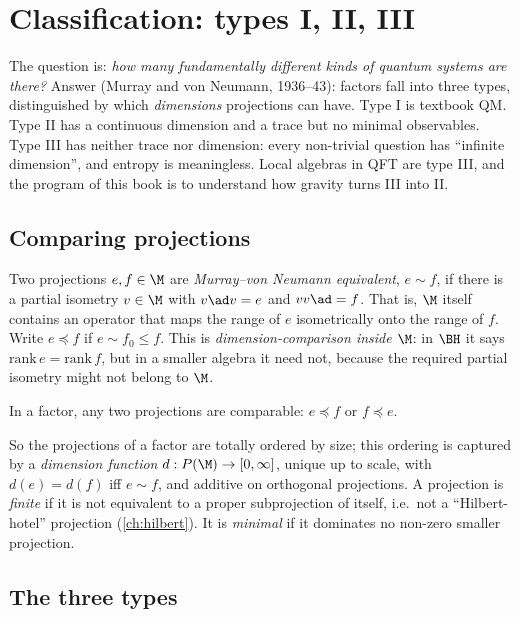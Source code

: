 \chapter{Classification: types I, II, III}\label{ch:classification}

\begin{physmotiv}
The question is: \emph{how many fundamentally different kinds of quantum systems are there?} Answer (Murray and von Neumann, 1936--43): factors fall into three types, distinguished by which \emph{dimensions} projections can have. Type I is textbook QM. Type II has a continuous dimension and a trace but no minimal observables. Type III has neither trace nor dimension: every non-trivial question has ``infinite dimension'', and entropy is meaningless. Local algebras in QFT are type III, and the program of this book is to understand how gravity turns III into II.
\end{physmotiv}

\section{Comparing projections}

Two projections $e,f\in\M$ are \emph{Murray--von Neumann equivalent}, $e\sim f$, if there is a partial isometry $v\in\M$ with $v\ad v=e$ and $vv\ad=f$. That is, $\M$ itself contains an operator that maps the range of $e$ isometrically onto the range of $f$. Write $e\preceq f$ if $e\sim f_0\le f$. This is \emph{dimension-comparison inside $\M$}: in $\BH$ it says $\mathrm{rank}\,e=\mathrm{rank}\,f$, but in a smaller algebra it need not, because the required partial isometry might not belong to $\M$.

\begin{theorem}[comparison]
In a factor, any two projections are comparable: $e\preceq f$ or $f\preceq e$.
\end{theorem}
So the projections of a factor are totally ordered by size; this ordering is captured by a \emph{dimension function} $d:P(\M)\to[0,\infty]$, unique up to scale, with $d(e)=d(f)$ iff $e\sim f$, and additive on orthogonal projections. A projection is \emph{finite} if it is not equivalent to a proper subprojection of itself, i.e.\ not a ``Hilbert-hotel'' projection (\cref{ch:hilbert}). It is \emph{minimal} if it dominates no non-zero smaller projection.

\section{The three types}

